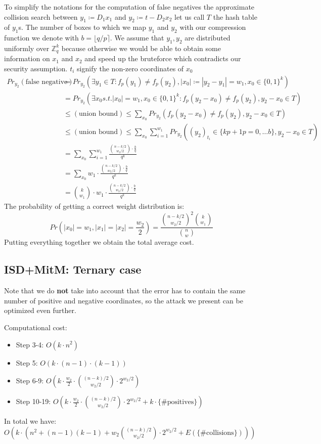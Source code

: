 \documentclass[12pt]{article}
\newcommand{\ZZ}{\mathbb{Z}}
\begin{document}
To simplify the notations for the computation of false negatives the approximate collision search between $y_1 \coloneqq D_1x_1$ and $y_2 \coloneqq t-D_2x_2$ let us call $T$ the hash table of $y_1$s. The number of boxes to which we map $y_1$ and $y_2$ with our compression function we denote with $b = \lfloor q/p \rceil$. We assume that $y_1, y_2$ are distributed uniformly over $\ZZ_q^{k}$ because otherwise we would be able to obtain some information on $x_1$ and $x_2$ and speed up the bruteforce which contradicts our security assumption. $t_i$ signify the non-zero coordinates of $x_0$
\[
\begin{split}
    Pr_{y_2}(\text{false negative}) & = Pr_{y_2}(\exists y_1 \in T: f_p(y_1) \neq f_p(y_2), |x_0| \coloneqq |y_2 - y_1| = w_1, x_0 \in \{0,1\}^{k}) \\
    & = Pr_{y_2}(\exists x_0 s.t. |x_0| = w_1, x_0 \in\{0,1\}^{k}: f_p(y_2 - x_0) \neq f_p(y_2), y_2 - x_0 \in T) \\
    & \leq (\text{union bound}) \leq \sum_{x_0} Pr_{y_2}(f_p(y_2 - x_0) \neq f_p(y_2), y_2 - x_0 \in T) \\
    & \leq (\text{union bound}) \leq \sum_{x_0} \sum_{i = 1}^{w_1} Pr_{y_2}((y_2)_{t_i} \in \{kp+1 p=0, \dots b\}, y_2 - x_0 \in T) \\
    & = \sum_{x_0} \sum_{i = 1}^{w_1} \frac{\binom{n-k/2}{w_2/2} \cdot \frac{b}{q}}{q^k} \\
    & = \sum_{x_0} w_1 \cdot \frac{\binom{n-k/2}{w_2/2} \cdot \frac{b}{q}}{q^k} \\
    & = \binom{k}{w_1} \cdot w_1 \cdot \frac{\binom{n-k/2}{w_2/2} \cdot \frac{b}{q}}{q^k}
\end{split}
\]
The probability of getting a correct weight distribution is:
\[
    Pr(|x_0| = w_1, |x_1| = |x_2| = \frac{w_2}{2}) = \frac{\binom{n-k/2}{w_2/2}^{2}\binom{k}{w_1}}{\binom{n}{w}}
\]
Putting everything together we obtain the total average cost.

\subsection{ISD+MitM: Ternary case}
Note that we do \textbf{not} take into account that the error has to contain the same number of positive and negative coordinates, so the attack we present can be optimized even further.

Computational cost:
\begin{itemize}
    \item Step 3-4: $O(k \cdot n^2)$
    \item Step 5: $O(k \cdot (n-1) \cdot (k-1))$
    \item Step 6-9: $O(k \cdot \frac{w_2}{2} \cdot \binom{(n-k)/2}{w_2/2} \cdot 2^{w_2/2})$
    \item Step 10-19: $O(k \cdot \frac{w_2}{2} \cdot \binom{(n-k)/2}{w_2/2} \cdot 2^{w_2/2} + k \cdot \{\text{\# positives}\})$
\end{itemize}
In total we have: $O(k \cdot (n^2 + (n-1)(k-1) + w_2\binom{(n-k)/2}{w_2/2} \cdot 2^{w_2/2} + E(\{\text{\# collisions}\})))$
\end{document}

